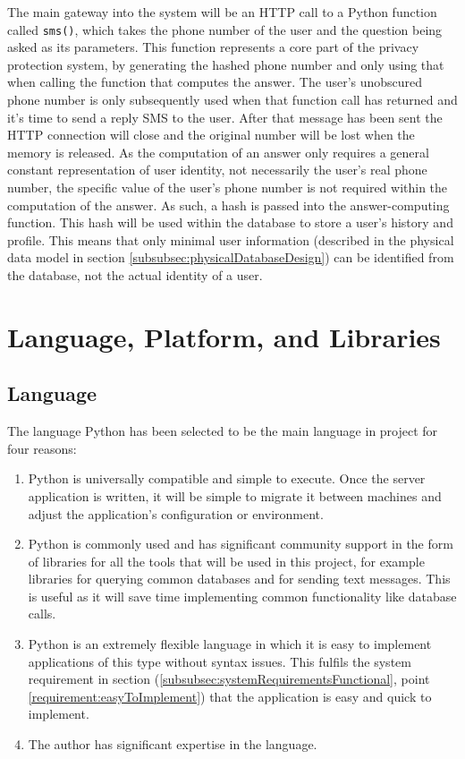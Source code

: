 \documentclass[authoryearcitations]{UoYCSproject}
\begin{document}
The main gateway into the system will be an HTTP call to a Python function called \texttt{sms()}, which takes the phone number of the user and the question being asked as its parameters.  This function represents a core part of the privacy protection system, by generating the hashed phone number and only using that when calling the function that computes the answer.  The user's unobscured phone number is only subsequently used when that function call has returned and it's time to send a reply SMS to the user. After that message has been sent the HTTP connection will close and the original number will be lost when the memory is released. As the computation of an answer only requires a general constant representation of user identity, not necessarily the user's real phone number, the specific value of the user's phone number is not required within the computation of the answer.  As such, a hash is passed into the answer-computing function.  This hash will be used within the database to store a user's history and profile.  This means that only minimal user information (described in the physical data model in section \ref{subsubsec:physicalDatabaseDesign}) can be identified from the database, not the actual identity of a user.

\section{Language, Platform, and Libraries}
\subsection{Language}
\label{section:designLanguage}
The language Python has been selected to be the main language in project for four reasons:
\begin{enumerate}
  \item Python is universally compatible and simple to execute.  Once the server application is written, it will be simple to migrate it between machines and adjust the application's configuration or environment.
  \item Python is commonly used and has significant community support in the form of libraries for all the tools that will be used in this project, for example libraries for querying common databases and for sending text messages.  This is useful as it will save time implementing common functionality like database calls.
  \item Python is an extremely flexible language in which it is easy to implement applications of this type without syntax issues.  This fulfils the system requirement in section (\ref{subsubsec:systemRequirementsFunctional}, point \ref{requirement:easyToImplement}) that the application is easy and quick to implement.
  \item The author has significant expertise in the language.
\end{enumerate}
\end{document}
